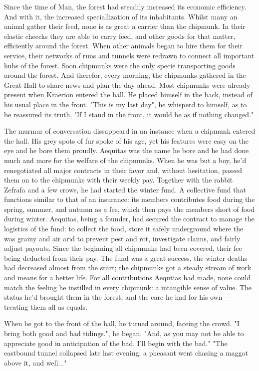 Since the time of Man, the forest had steadily increased its economic efficiency. And with it, the increased speciallization of its inhabitants. Whilst many an animal gather their feed, none is as great a carrier than the chipmunk. In their elastic cheecks they are able to carry feed, and other goods for that matter, efficiently around the forest. When other animals began to hire them for their service, their networks of runs and tunnels were redrawn to connect all important hubs of the forest. Soon chipmunks were the only specie transporting goods around the forest. And therefor, every morning, the chipmunks gathered in the Great Hall to share news and plan the day ahead.
  Most chipmunks were already present when Kraerion entered the hall. He placed himself in the back, instead of his usual place in the front.
"This is my last day", he whisperd to himself, as to be reassured its truth, "If I stand in the front, it would be as if nothing changed."

The murmur of conversation dissappeard in an instance when a chipmunk entered the hall. His grey spots of fur spoke of his age, yet his features were easy on the eye and he bore them proudly.
 Aequitas was the name he bore and he had done much and more for the welfare of the chipmunks. When he was but a boy, he'd renegotiated all major contracts in their favor and, without hesitation, passed them on to the chipmunks with their weekly pay. Together with the rabbit Zefrafa and a few crows, he had started the winter fund. A collective fund that functions similar to that of an insurance: its members contributes food during the spring, summer, and autumn as a fee, which then pays the members short of food during winter. Aequitas, being a founder, had secured the contract to manage the logistics of the fund: to collect the food, store it safely underground where the was grainy and air arid to prevent pest and rot, investigate claims, and fairly adjust payouts. Since the beginning all chipmunks had been covered, their fee being deducted from their pay. The fund was a great success, the winter deaths had decreased almost from the start; the chipmunks got a steady stream of work and means for a better life.
For all contributions Aequtias had made, none could match the feeling he instilled in every chipmunk: a intangible sense of value. The status he'd brought them in the forest, and the care he had for his own — treating them all as equals.

When he got to the front of the hall, he turned around, faceing the crowd.
"I bring both good and bad tidings.", he began. "And, as you may not be able to appreciate good in anticipation of the bad, I'll begin with the bad."
  "The eastbound tunnel collapsed late last evening; a pheasant went chasing a maggot above it, and well..."

